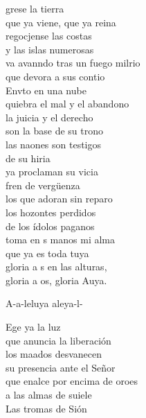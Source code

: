 \begin{cancion}%
	grese la tierra  \\
que ya viene, que ya reina\\
	regocjense las costas \\
y las islas numerosas\\
	va avanndo tras un fuego milrio\\
	que devora a sus contio\\
	Envto en una nube \\
quiebra el mal y el abandono\\
	la juicia y el derecho \\
son la base de su trono\\
	las naones son testigos \\
	de su hiria\\
	ya proclaman su vicia\\
	fren de vergüenza \\
los que adoran sin reparo\\
	los hozontes perdidos \\
de los ídolos paganos\\
	toma en s manos mi alma \\
	que ya es toda tuya\\
	gloria a s en las alturas, \\
	gloria a os, gloria Auya.\\
	\begin{chorus}%
	A-a-leluya aleya-l-\\
	\end{chorus}%
	Ege ya la luz \\
que anuncia la liberación\\
	los maados desvanecen \\
su presencia ante el Señor\\
	que enalce por encima de oroes\\
	a las almas de suiele\\
	Las tromas de Sión \\

\end{cancion}
